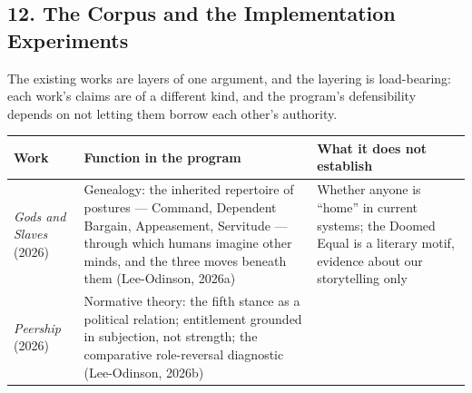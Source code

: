 \documentclass[
  11pt,
  letterpaper,
]{article}
\begin{document}
\hypertarget{the-corpus-and-the-implementation-experiments}{%
\subsection{12. The Corpus and the Implementation
Experiments}\label{the-corpus-and-the-implementation-experiments}}

The existing works are layers of one argument, and the layering is
load-bearing: each work's claims are of a different kind, and the
program's defensibility depends on not letting them borrow each other's
authority.

\begin{longtable}[]{@{}lll@{}}
\toprule
\begin{minipage}[b]{0.30\columnwidth}\raggedright
Work\strut
\end{minipage} & \begin{minipage}[b]{0.30\columnwidth}\raggedright
Function in the program\strut
\end{minipage} & \begin{minipage}[b]{0.30\columnwidth}\raggedright
What it does not establish\strut
\end{minipage}\tabularnewline
\midrule
\endhead
\begin{minipage}[t]{0.30\columnwidth}\raggedright
\emph{Gods and Slaves} (2026)\strut
\end{minipage} & \begin{minipage}[t]{0.30\columnwidth}\raggedright
Genealogy: the inherited repertoire of postures --- Command, Dependent
Bargain, Appeasement, Servitude --- through which humans imagine other
minds, and the three moves beneath them (Lee-Odinson, 2026a)\strut
\end{minipage} & \begin{minipage}[t]{0.30\columnwidth}\raggedright
Whether anyone is ``home'' in current systems; the Doomed Equal is a
literary motif, evidence about our storytelling only\strut
\end{minipage}\tabularnewline
\begin{minipage}[t]{0.30\columnwidth}\raggedright
\emph{Peership} (2026)\strut
\end{minipage} & \begin{minipage}[t]{0.30\columnwidth}\raggedright
Normative theory: the fifth stance as a political relation; entitlement
grounded in subjection, not strength; the comparative role-reversal
diagnostic (Lee-Odinson, 2026b)\strut
\end{minipage} & \begin{minipage}[t]{0.30\columnwidth}\raggedright

\end{minipage}
\end{longtable}
\end{document}

